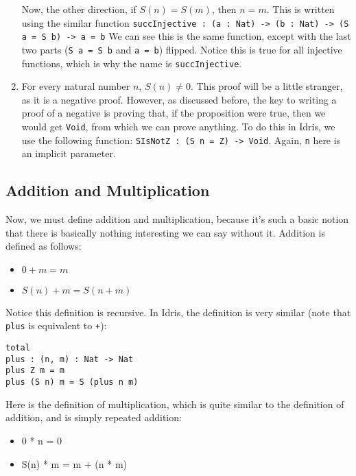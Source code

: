 \documentclass{article}
\newcommand{\inline}[1]{\texttt{#1}}
\begin{document}
\begin{enumerate}
        Now, the other direction, if $S(n) = S(m)$, then $n = m$.
        This is written using the similar function \inline{succInjective : (a : Nat) -> (b : Nat) -> (S a = S b) -> a = b}
        We can see this is the same function, except with the last two parts (\inline{S a = S b} and \inline{a = b}) flipped.
        Notice this is true for all injective functions, which is why the name is \inline{succInjective}.

    \item For every natural number $n$, $S(n) \neq 0$.
        This proof will be a little stranger, as it is a negative proof.
        However, as discussed before, the key to writing a proof of a negative is proving that, if the proposition were true, then we would get \inline{Void}, from which we can prove anything.
        To do this in Idris, we use the following function: \inline{SIsNotZ : (S n = Z) -> Void}.
        Again, \inline{n} here is an implicit parameter.
\end{enumerate}

\subsection{Addition and Multiplication}
Now, we must define addition and multiplication, because it's such a basic notion that there is basically nothing interesting we can say without it.
Addition is defined as follows:

\begin{itemize}
    \item[] $0 + m = m$
    \item[] $S(n) + m = S(n + m)$
\end{itemize}

Notice this definition is recursive.
In Idris, the definition is very similar (note that \inline{plus} is equivalent to \inline{+}):

\begin{verbatim}
total
plus : (n, m) : Nat -> Nat
plus Z m = m
plus (S n) m = S (plus n m)
\end{verbatim}

Here is the definition of multiplication, which is quite similar to the definition of addition, and is simply repeated addition:

\begin{itemize}
    \item[] 0 * n = 0
    \item[] S(n) * m = m + (n * m)
\end{itemize}
\end{document}
